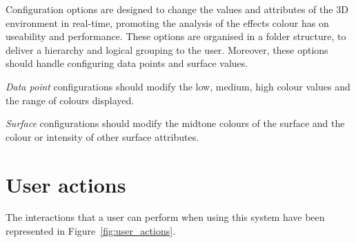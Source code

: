 {{{			Configuration options are designed to change the values and attributes of the 3D environment in real-time, promoting the analysis of the effects colour has on useability and performance. These options are organised in a folder structure, to deliver a hierarchy and logical grouping to the user. Moreover, these options should handle configuring data points and surface values.

			\emph{Data point} configurations should modify the low, medium, high colour values and the range of colours displayed.

			\emph{Surface} configurations should modify the midtone colours of the surface and the colour or intensity of other surface attributes.

		}

	}

}

\section{User actions} {
\label{sec:user_actions}

	The interactions that a user can perform when using this system have been represented in Figure~\ref{fig:user_actions}.


	

}

